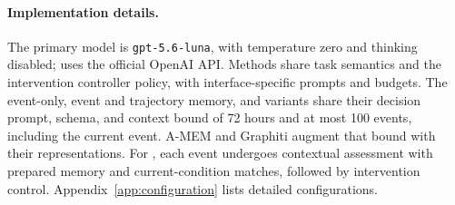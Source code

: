 \paragraph{Implementation details.}
The primary model is \texttt{gpt-5.6-luna}, with temperature zero and thinking disabled; \system{} uses the official OpenAI API.
Methods share task semantics and the intervention controller policy, with interface-specific prompts and budgets.
The event-only, event and trajectory memory, and \system{} variants share their decision prompt, schema, and context bound of 72 hours and at most 100 events, including the current event.
A-MEM and Graphiti augment that bound with their representations.
For \system{}, each event undergoes contextual assessment with prepared memory and current-condition matches, followed by intervention control.
Appendix~\ref{app:configuration} lists detailed configurations.
